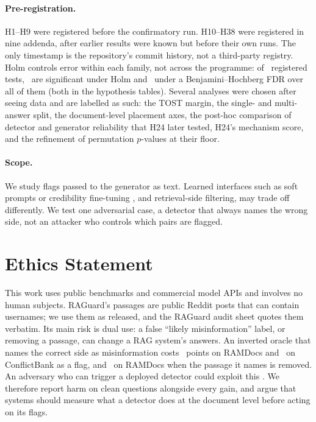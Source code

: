 \paragraph{Pre-registration.} H1--H9 were registered before the confirmatory run. H10--H38
were registered in nine addenda, after earlier results were known but before their own runs. The only
timestamp is the repository's commit history, not a third-party registry. Holm controls error within each family, not
across the programme: of \fdrN\ registered tests, \fdrHolm\ are significant under Holm and \fdrBH\ under a
Benjamini--Hochberg FDR over all of them (both in the hypothesis tables). Several analyses were chosen after
seeing data and are labelled as such: the TOST margin, the single- and multi-answer split, the document-level
placement axes, the post-hoc comparison of detector and generator reliability that H24 later tested, H24's mechanism
score, and the refinement of permutation $p$-values at their floor.

\paragraph{Scope.} We study flags passed to the generator as text. Learned interfaces such as soft prompts or
credibility fine-tuning \citep{ye2026tcr,pan2024credibility}, and retrieval-side filtering, may trade off differently. We test one adversarial case, a detector that always names the wrong side, not an attacker who controls
which pairs are flagged.

\section*{Ethics Statement}
This work uses public benchmarks and commercial model APIs and involves no human subjects. RAGuard's passages are
public Reddit posts that can contain usernames; we use them as released, and the RAGuard audit sheet quotes them verbatim. Its main
risk is dual use: a false ``likely misinformation'' label, or removing a passage, can
change a RAG system's answers. An inverted oracle that names the correct side as misinformation costs \aadvDirConf\
points on RAMDocs and \azCbMiniOracleInvFlagDirectionalConflict\ on ConflictBank as a flag, and \aadvRemConf\ on
RAMDocs when the passage it names is removed. An adversary who can trigger a deployed detector could exploit this
\citep{zou2025poisonedrag}. We therefore report harm on clean questions alongside every gain, and argue that
systems should measure what a detector does at the document level before acting on its flags.
